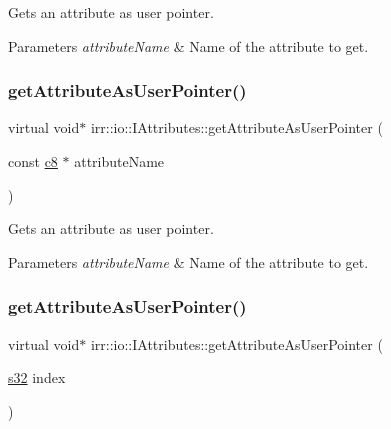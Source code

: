 Gets an attribute as user pointer. 


\begin{DoxyParams}{Parameters}
{\em attribute\+Name} & Name of the attribute to get. \\
\hline
\end{DoxyParams}
\mbox{\label{classirr_1_1io_1_1IAttributes_a6f97e7af81f611bd13ced0378531ed2d}} 
\subsubsection{\texorpdfstring{get\+Attribute\+As\+User\+Pointer()}{getAttributeAsUserPointer()}\hspace{0.1cm}{\footnotesize\ttfamily [2/4]}}
{\footnotesize\ttfamily virtual void$\ast$ irr\+::io\+::\+I\+Attributes\+::get\+Attribute\+As\+User\+Pointer (\begin{DoxyParamCaption}\item[{const \hyperlink{namespaceirr_a9395eaea339bcb546b319e9c96bf7410}{c8} $\ast$}]{attribute\+Name }\end{DoxyParamCaption})\hspace{0.3cm}{\ttfamily [pure virtual]}}



Gets an attribute as user pointer. 


\begin{DoxyParams}{Parameters}
{\em attribute\+Name} & Name of the attribute to get. \\
\hline
\end{DoxyParams}
\mbox{\label{classirr_1_1io_1_1IAttributes_ae720da1bc66bc535ab839e95018d7398}} 
\subsubsection{\texorpdfstring{get\+Attribute\+As\+User\+Pointer()}{getAttributeAsUserPointer()}\hspace{0.1cm}{\footnotesize\ttfamily [3/4]}}
{\footnotesize\ttfamily virtual void$\ast$ irr\+::io\+::\+I\+Attributes\+::get\+Attribute\+As\+User\+Pointer (\begin{DoxyParamCaption}\item[{\hyperlink{namespaceirr_ac66849b7a6ed16e30ebede579f9b47c6}{s32}}]{index }\end{DoxyParamCaption})\hspace{0.3cm}{\ttfamily [pure virtual]}}



